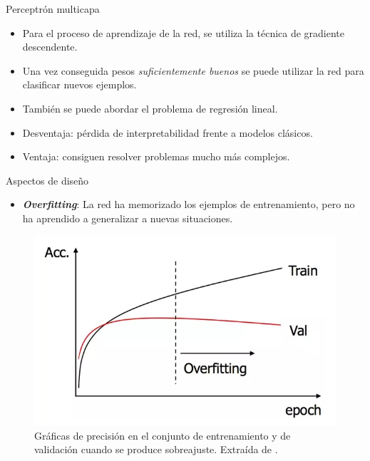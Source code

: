 \documentclass[spanish]{beamer}
\begin{document}
\begin{frame}{Perceptrón multicapa}
  \begin{itemize}
    \item Para el proceso de aprendizaje de la red, se utiliza la técnica de gradiente descendente.
    \item Una vez conseguida pesos \textit{suficientemente buenos} se puede utilizar la red para clasificar nuevos ejemplos.
    \item También se puede abordar el problema de regresión lineal.
    \item Desventaja: pérdida de interpretabilidad frente a modelos clásicos.
    \item Ventaja: consiguen resolver problemas mucho más complejos.
  \end{itemize}
\end{frame}

\begin{frame}{Aspectos de diseño}
  \begin{itemize}
\item \textbf{\textit{Overfitting}}: La red ha memorizado los ejemplos de entrenamiento, pero no ha aprendido a generalizar a nuevas situaciones.
  \end{itemize}
  \vspace{1em}
\begin{figure}[h]
  \centering
  \includegraphics[width=.6\textwidth]{img/overfitting}
  \caption{Gráficas de precisión en el conjunto de entrenamiento y de validación cuando se produce sobreajuste. Extraída de \parencite{quora_overfitting_2016}.}
  \label{fig:overfitting}
\end{figure}
\end{frame}
\end{document}
